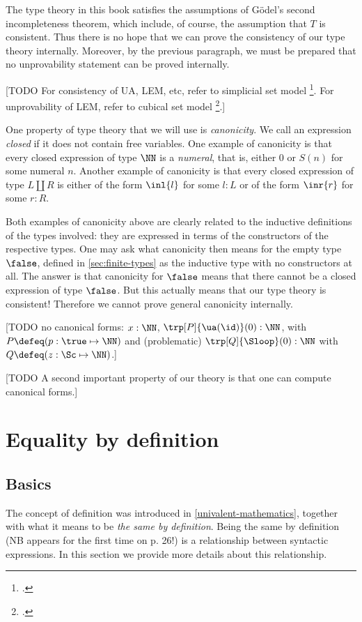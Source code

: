 The type theory in this book satisfies the assumptions of
G\"{o}del's second incompleteness theorem, which include, of course,
the assumption that $T$ is consistent. Thus there is no hope
that we can prove the consistency of our type theory internally.
Moreover, by the previous paragraph, we must be prepared that
no unprovability statement can be proved internally.

[TODO For consistency of UA, LEM, etc, refer to simplicial set model \footcite{KapLum}.
For unprovability of LEM, refer to cubical set model \footcite{BezCoqHub}.]

One property of type theory that we will use is \emph{canonicity}.
We call an expression \emph{closed} if it does not contain free variables.
One example of canonicity is that every closed expression of type $\NN$
is a \emph{numeral}, that is, either $0$ or $S(n)$ for some numeral $n$.
Another example of canonicity is that every closed expression of 
type $L\coprod R$ is either of the form $\inl{l}$ for some $l:L$ or
of the form $\inr{r}$ for some $r:R$.

Both examples of canonicity above are clearly related to the
inductive definitions of the types involved: they are
expressed in terms of the constructors of the respective types.
One may ask what canonicity then means for the empty type $\false$,
defined in \cref{sec:finite-types} as the inductive type
with no constructors at all. The answer is that canonicity for $\false$
means that there cannot be a closed expression of type $\false$.
But this actually means that our type theory is consistent!
Therefore we cannot prove general canonicity internally.

[TODO no canonical forms: $x:\NN$, $\trp[P]{\ua(\id)}(0): \NN$,
with $P\defeq (p:\true \mapsto \NN)$
and (problematic) $\trp[Q]{\Sloop}(0): \NN$
with $Q\defeq (z:\Sc \mapsto \NN)$.]

[TODO A second important property of our theory is 
that one can compute canonical forms.]

\section{Equality by definition}
\label{sec:defeq}

\subsection{Basics}
\label{sec:defeq-basics}

The concept of definition was introduced in \cref{univalent-mathematics},
together with what it means to be \emph{the same by definition}. 
Being the same by definition (NB appears for the first time on p. 26!) 
is a relationship between syntactic expressions.
In this section we provide more details about this relationship.


